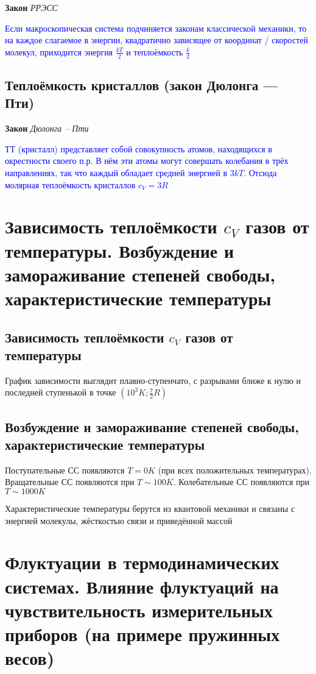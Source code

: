 \documentclass[a4paper, 14pt]{article}
\begin{document}
    \textbf{Закон} \textit{РРЭСС}

    \textcolor{blue}{Если макроскопическая система подчиняется законам классической механики, то на каждое слагаемое
    в энергии, квадратично зависящее от координат / скоростей молекул, приходится энергия $\frac{kT}{2}$ и
    теплоёмкость $\frac{k}{2}$}

    \subsection{Теплоёмкость кристаллов (закон Дюлонга — Пти)}

    \textbf{Закон} \textit{Дюлонга -- Пти}

    \textcolor{blue}{ТТ (кристалл) представляет собой совокупность атомов, находящихся в окрестности своего п.р.
    В нём эти атомы могут совершать колебания в трёх направлениях, так что каждый обладает средней энергией в $3kT$.
    Отсюда молярная теплоёмкость кристаллов $c_V = 3R$}

    \section{Зависимость теплоёмкости $c_V$ газов от температуры.
    Возбуждение и замораживание степеней свободы, характеристические температуры}

    \subsection{Зависимость теплоёмкости $c_V$ газов от температуры}

    График зависимости выглядит плавно-ступенчато, с разрывами ближе к нулю и последней ступенькой в точке
    $(10^3 K; \frac{7}{2}R)$

    \subsection{Возбуждение и замораживание степеней свободы, характеристические температуры}

    Поступательные СС появляются $T = 0 K$ (при всех положительных температурах).
    Вращательные СС появляются при $T \sim 100 K$.
    Колебательные СС появляются при $T \sim 1000 K$

    Характеристические температуры берутся из квантовой механики и связаны с энергией молекулы, жёсткостью связи и
    приведённой массой

    \section{Флуктуации в термодинамических системах.
    Влияние флуктуаций на чувствительность измерительных приборов (на примере пружинных весов)}
\end{document}
